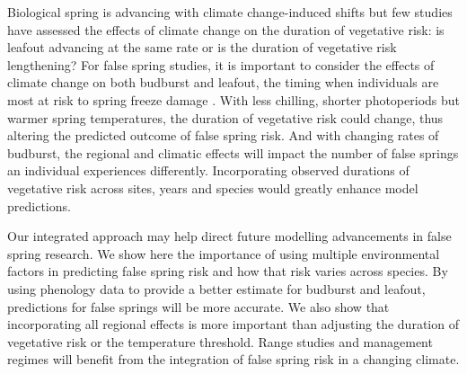 \documentclass{article}\usepackage[]{graphicx}\usepackage[]{color}
\begin{document}
Biological spring is advancing with climate change-induced shifts but few studies have assessed the effects of climate change on the duration of vegetative risk: is leafout advancing at the same rate or is the duration of vegetative risk lengthening? For false spring studies, it is important to consider the effects of climate change on both budburst and leafout, the timing when individuals are most at risk to spring freeze damage \citep{Chamberlain2019,Lenz2016}. With less chilling, shorter photoperiods but warmer spring temperatures, the duration of vegetative risk could change, thus altering the predicted outcome of false spring risk. And with changing rates of budburst, the regional and climatic effects will impact the number of false springs an individual experiences differently. Incorporating observed durations of vegetative risk across sites, years and species would greatly enhance model predictions. 

Our integrated approach may help direct future modelling advancements in false spring research. We show here the importance of using multiple environmental factors in predicting false spring risk and how that risk varies across species. By using phenology data to provide a better estimate for budburst and leafout, predictions for false springs will be more accurate. We also show that incorporating all regional effects is more important than adjusting the duration of vegetative risk or the temperature threshold. Range studies and management regimes will benefit from the integration of false spring risk in a changing climate. 

  
\end{document}
